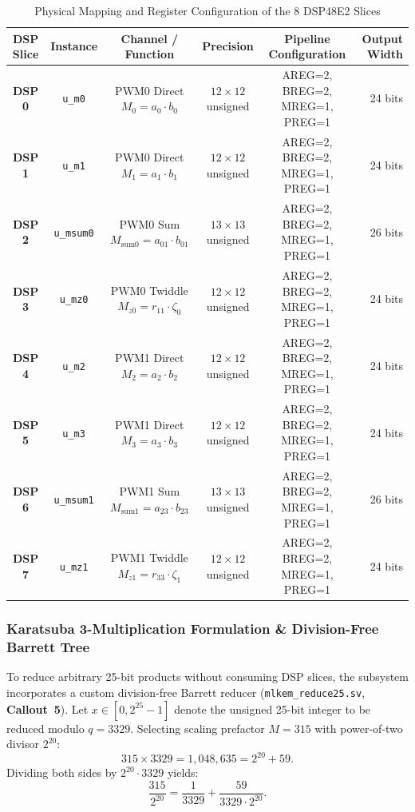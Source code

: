 \begin{table}[!t]
\caption{Physical Mapping and Register Configuration of the 8 DSP48E2 Slices}
\label{tab:dsp_assignment}
\centering
\footnotesize
\begin{tabular*}{\textwidth}{@{\extracolsep{\fill}} cccccr @{}}
\toprule
\textbf{DSP Slice} & \textbf{Instance} & \textbf{Channel / Function} & \textbf{Precision} & \textbf{Pipeline Configuration} & \textbf{Output Width} \\
\midrule
\textbf{DSP 0} & \texttt{u\_m0}    & PWM0 Direct $M_0 = a_0 \cdot b_0$       & $12 \times 12$ unsigned & AREG=2, BREG=2, MREG=1, PREG=1 & 24 bits \\
\textbf{DSP 1} & \texttt{u\_m1}    & PWM0 Direct $M_1 = a_1 \cdot b_1$       & $12 \times 12$ unsigned & AREG=2, BREG=2, MREG=1, PREG=1 & 24 bits \\
\textbf{DSP 2} & \texttt{u\_msum0} & PWM0 Sum $M_{\text{sum}0} = a_{01} \cdot b_{01}$    & $13 \times 13$ unsigned & AREG=2, BREG=2, MREG=1, PREG=1 & 26 bits \\
\textbf{DSP 3} & \texttt{u\_mz0}   & PWM0 Twiddle $M_{z0} = r_{11} \cdot \zeta_0$ & $12 \times 12$ unsigned & AREG=2, BREG=2, MREG=1, PREG=1 & 24 bits \\
\textbf{DSP 4} & \texttt{u\_m2}    & PWM1 Direct $M_2 = a_2 \cdot b_2$      & $12 \times 12$ unsigned & AREG=2, BREG=2, MREG=1, PREG=1 & 24 bits \\
\textbf{DSP 5} & \texttt{u\_m3}    & PWM1 Direct $M_3 = a_3 \cdot b_3$      & $12 \times 12$ unsigned & AREG=2, BREG=2, MREG=1, PREG=1 & 24 bits \\
\textbf{DSP 6} & \texttt{u\_msum1} & PWM1 Sum $M_{\text{sum}1} = a_{23} \cdot b_{23}$  & $13 \times 13$ unsigned & AREG=2, BREG=2, MREG=1, PREG=1 & 26 bits \\
\textbf{DSP 7} & \texttt{u\_mz1}   & PWM1 Twiddle $M_{z1} = r_{33} \cdot \zeta_1$ & $12 \times 12$ unsigned & AREG=2, BREG=2, MREG=1, PREG=1 & 24 bits \\
\bottomrule
\end{tabular*}
\end{table}

\subsubsection{Karatsuba 3-Multiplication Formulation \& Division-Free Barrett Tree}
\label{sec05b_barrett_math}

To reduce arbitrary 25-bit products without consuming DSP slices, the subsystem incorporates a custom division-free Barrett reducer (\texttt{mlkem\_reduce25.sv}, \textbf{Callout~5}). Let $x \in [0, 2^{25}-1]$ denote the unsigned 25-bit integer to be reduced modulo $q = 3329$. Selecting scaling prefactor $M = 315$ with power-of-two divisor $2^{20}$:
\begin{equation}
315 \times 3329 = 1,048,635 = 2^{20} + 59.
\end{equation}
Dividing both sides by $2^{20} \cdot 3329$ yields:
\begin{equation}
\frac{315}{2^{20}} = \frac{1}{3329} + \frac{59}{3329 \cdot 2^{20}}.
\end{equation}

